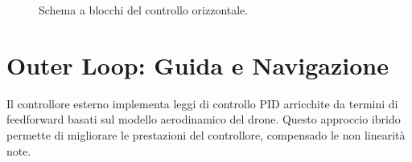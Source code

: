 \begin{figure}[htbp]
{
    }
    \caption{Schema a blocchi del controllo orizzontale.}
    \label{fig:control_scheme_horizontal}
\end{figure}
\clearpage

\section{Outer Loop: Guida e Navigazione}
Il controllore esterno implementa leggi di controllo PID arricchite da termini di feedforward basati sul modello aerodinamico del drone. Questo approccio ibrido permette di migliorare le prestazioni del controllore, compensado le non linearità note.

